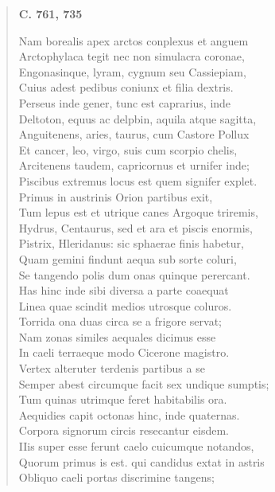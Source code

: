 \documentclass[11pt, a4paper]{report}
\begin{document}
\begin{verse}
     \marginpar{[244]} \begin{center} \textbf{C. 761, 735} \end{center}Nam borealis apex arctos conplexus et anguem \\ Arctophylaca tegit nec non simulacra coronae, \\ Engonasinque, lyram, cygnum seu Cassiepiam, \\ Cuius adest pedibus coniunx et filia dextris. \\ Perseus inde gener, tunc est caprarius, inde \\ Deltoton, equus ac delpbin, aquila atque sagitta, \\ Anguitenens, aries, taurus, cum Castore Pollux \\ Et cancer, leo, virgo, suis cum scorpio chelis, \\ Arcitenens taudem, capricornus et urnifer inde; \\ Piscibus extremus locus est quem signifer explet. \\ Primus in austrinis Orion partibus exit, \\ Tum lepus est et utrique canes Argoque triremis, \\ Hydrus, Centaurus, sed et ara et piscis enormis, \\ Pistrix, Hleridanus: sic sphaerae finis habetur, \\ Quam gemini findunt aequa sub sorte coluri, \\ Se tangendo polis dum onas quinque perercant. \\ Has hinc inde sibi diversa a parte coaequat \\ Linea quae scindit medios utrosque coluros. \\ Torrida ona duas circa se a frigore servat; \\ Nam zonas similes aequales dicimus esse \\ In caeli terraeque modo Cicerone magistro. \\ Vertex alteruter terdenis partibus a se \\ Semper abest circumque facit sex undique sumptis; \\ Tum quinas utrimque feret habitabilis ora. \\ Aequidies capit octonas hinc, inde quaternas. \\ Corpora signorum circis resecantur eisdem. \\ IIis super esse ferunt caelo cuicumque notandos, \\ Quorum primus is est. qui candidus extat in astris \\ Obliquo caeli portas discrimine tangens; \\ 

\end{verse}
\end{document}
